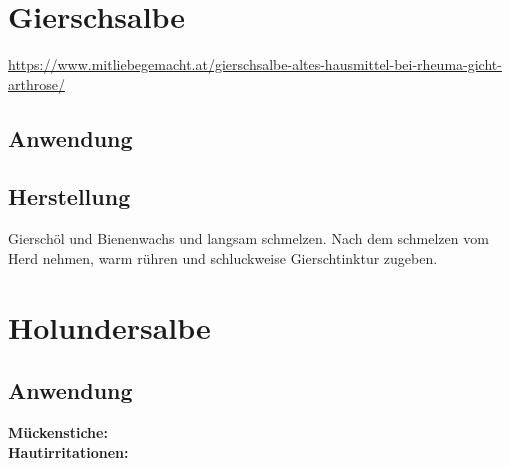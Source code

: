 


\newpage




\section{Gierschsalbe}


\url{https://www.mitliebegemacht.at/gierschsalbe-altes-hausmittel-bei-rheuma-gicht-arthrose/}

    

\subsection{Anwendung}
\subsection{Herstellung}
Gierschöl und Bienenwachs und langsam schmelzen. Nach dem schmelzen vom Herd nehmen, warm rühren und schluckweise Gierschtinktur zugeben.




\newpage




\section{Holundersalbe}


   

\subsection{Anwendung}
\textbf{Mückenstiche:} \\ 

\textbf{Hautirritationen:} \\ 

